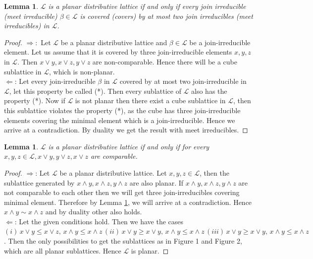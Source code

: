 \documentclass[10pt,reqno]{amsart}
\numberwithin{equation}{section}
\newtheorem{lemma}[theorem]{Lemma}
\begin{document}
\begin{lemma}\label{planar} $\mathcal{L}$ is a planar distributive lattice if and only if every join irreducible (meet irreducible) 
 $\beta \in \mathcal{L}$ is covered (covers) by at most two join irreducibles (meet irreducibles) in $\mathcal{L}$.
\end{lemma}
\begin{proof}
 $\Rightarrow:$ Let $\mathcal{L}$ be a planar distributive lattice and $\beta \in \mathcal{L}$ be a join-irreducible element. Let us assume that it is covered by three join-irreducible elements $x,y,z$ in $\mathcal{L}$. Then 
$x \vee y, x \vee z, y\vee z$ are non-comparable. Hence there will be a cube sublattice in $\mathcal{L}$, which is 
non-planar.
\\
$\Leftarrow$: Let every join-irreducible $\beta$ in $\mathcal{L}$ covered by at most two join-irreducible in $\mathcal{L}$, let this
property be called (*). Then 
every sublattice of $\mathcal{L}$ also has the property (*). Now if $\mathcal{L}$ is not planar then there exist a cube 
sublattice in $\mathcal{L}$, then this sublattice violates the property (*), as the cube has three join-irreducible elements
covering the minimal element which is a join-irreducible. Hence we arrive at a contradiction. By duality we get the result with 
meet irreducibles.
\end{proof}
 \begin{lemma}\label{com}$\mathcal{L}$ is a planar distributive lattice if and only if for every $x,y,z \in \mathcal{L}, x\vee y, y \vee z, x \vee z$ are comparable.  
 \end{lemma}
 \begin{proof}  $\Rightarrow$: Let $\mathcal{L}$ be a planar distributive lattice. Let $x,y,z \in \mathcal{L}$, then 
the sublattice generated by $x \wedge y, x \wedge z, y \wedge z$ are also planar. If $x \wedge y, x \wedge z, y \wedge z$
are not comparable to each other then we will get three join-irreducibles covering minimal element. Therefore by Lemma \ref{planar},
we will arrive at a contradiction. Hence $x\wedge y \sim x \wedge z$ and by duality other also holds.
\\
$\Leftarrow$: Let the given conditions hold.
 Then we have the cases $(i)\, x\vee y \leq x \vee z,\, x\wedge y \leq x \wedge z\, (ii)\, x \vee y \geq x \vee y, \,
 x \wedge y \leq x \wedge z\,
 (iii)\,  x \vee y \geq x \vee y,\, x \wedge y \leq x \wedge z$. Then the only possibilities to get the sublattices as in Figure 1 and Figure 2, which are all planar sublattices. Hence $\mathcal{L}$ is planar.
 \end{proof} 
\end{document}
